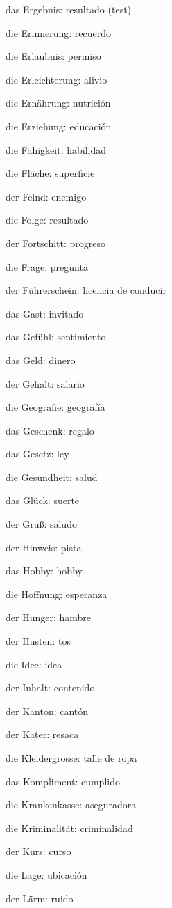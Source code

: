 \begin{multicols}{2}
\begin{myitemize}
\item das Ergebnis: resultado (test)
\item die Erinnerung: recuerdo
\item die Erlaubnis: permiso
\item die Erleichterung: alivio
\item die Ernährung: nutrición
\item die Erziehung: educación
\item die Fähigkeit: habilidad
\item die Fläche: superficie
\item der Feind: enemigo
\item die Folge: resultado
\item der Fortschitt: progreso
\item die Frage: pregunta
\item der Führerschein: licencia de conducir
\item das Gast: invitado
\item das Gefühl: sentimiento
\item das Geld: dinero
\item der Gehalt: salario
\item die Geografie: geografía
\item das Geschenk: regalo
\item das Gesetz: ley
\item die Gesundheit: salud
\item das Glück: suerte
\item der Gruß: saludo
\item der Hinweis: pista
\item das Hobby: hobby
\item die Hoffnung: esperanza
\item der Hunger: hambre
\item der Husten: tos
\item die Idee: idea
\item der Inhalt: contenido
\item der Kanton: cantón
\item der Kater: resaca
\item die Kleidergrösse: talle de ropa
\item das Kompliment: cumplido
\item die Krankenkasse: aseguradora
\item die Kriminalität: criminalidad
\item der Kurs: curso
\item die Lage: ubicación
\item der Lärm: ruido

\end{myitemize}
\end{multicols}
